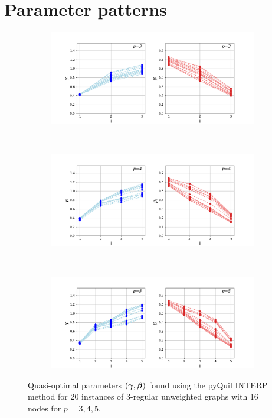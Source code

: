 \chapter{Parameter patterns}
\label{appendix:patterns}
\begin{figure}[H]
	\centering
	\begin{subfigure}[t]{0.7\textwidth}
		\centering
		\includegraphics[width=\textwidth]{figures/interp/patterns/pattern_16-nodal_p-3.png}
	\end{subfigure}
	\\
	\centering
	\begin{subfigure}[t]{0.7\textwidth}
		\centering
		\includegraphics[width=\textwidth]{figures/interp/patterns/pattern_16-nodal_p-4.png}
	\end{subfigure}
	\\
	\centering
	\begin{subfigure}[t]{0.7\textwidth}
		\centering
		\includegraphics[width=\textwidth]{figures/interp/patterns/pattern_16-nodal_p-5.png}
	\end{subfigure}
	\caption{Quasi-optimal parameters $(\bm{\gamma},\bm{\beta})$ found using the pyQuil INTERP method for 20 instances of 3-regular unweighted graphs with 16 nodes for $p = 3, 4, 5$.}
	\label{fig:appendix-patterns-16-nodal}
\end{figure}

